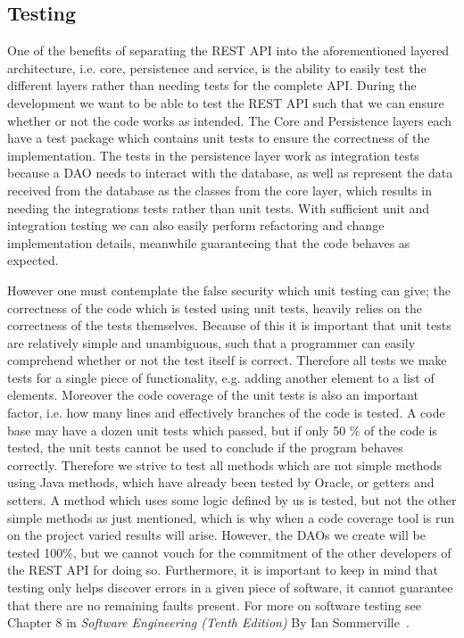 \subsection{Testing}
One of the benefits of separating the REST API into the aforementioned layered architecture, i.e. core, persistence and service, is the ability to easily test the different layers rather than needing tests for the complete API.
During the development we want to be able to test the REST API such that we can ensure whether or not the code works as intended.
The Core and Persistence layers each have a test package which contains unit tests to ensure the correctness of the implementation.
The tests in the persistence layer work as integration tests because a DAO needs to interact with the database, as well as represent the data received from the database as the classes from the core layer, which results in needing the integrations tests rather than unit tests.
With sufficient unit and integration testing we can also easily perform refactoring and change implementation details, meanwhile guaranteeing that the code behaves as expected.

However one must contemplate the false security which unit testing can give; the correctness of the code which is tested using unit tests, heavily relies on the correctness of the tests themselves.
Because of this it is important that unit tests are relatively simple and unambiguous, such that a programmer can easily comprehend whether or not the test itself is correct.
Therefore all tests we make tests for a single piece of functionality, e.g. adding another element to a list of elements.
Moreover the code coverage of the unit tests is also an important factor, i.e. how many lines and effectively branches of the code is tested.
A code base may have a dozen unit tests which passed, but if only 50 \% of the code is tested, the unit tests cannot be used to conclude if the program behaves correctly.
Therefore we strive to test all methods which are not simple methods using Java methods, which have already been tested by Oracle, or getters and setters.
A method which uses some logic defined by us is tested, but not the other simple methods as just mentioned, which is why when a code coverage tool is run on the project varied results will arise.
However, the DAOs we create will be tested 100\%, but we cannot vouch for the commitment of the other developers of the REST API for doing so.
Furthermore, it is important to keep in mind that testing only helps discover errors in a given piece of software, it cannot guarantee that there are no remaining faults present. For more on software testing see Chapter 8 in \textit{Software Engineering (Tenth Edition)} By Ian Sommerville~\cite[Chapter~8]{SEBOOK}.
